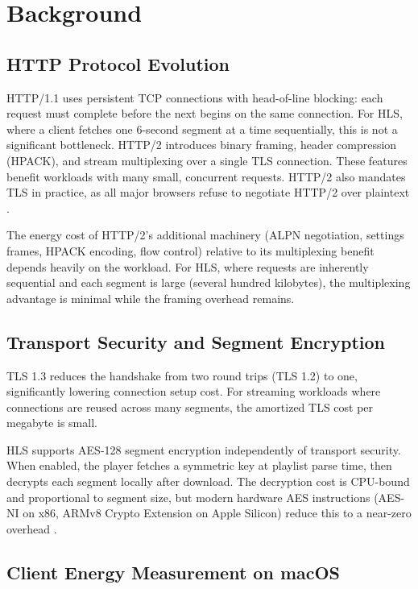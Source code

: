 \documentclass[conference]{IEEEtran}
\begin{document}
\section{Background}

\subsection{HTTP Protocol Evolution}

HTTP/1.1 \cite{b_http11} uses persistent TCP connections with head-of-line blocking:
each request must complete before the next begins on the same connection. For HLS,
where a client fetches one 6-second segment at a time sequentially, this is not a
significant bottleneck. HTTP/2 \cite{b_http2} introduces binary framing, header
compression (HPACK), and stream multiplexing over a single TLS connection. These
features benefit workloads with many small, concurrent requests. HTTP/2 also mandates
TLS in practice, as all major browsers refuse to negotiate HTTP/2 over plaintext
\cite{b_http2}.

The energy cost of HTTP/2's additional machinery (ALPN negotiation, settings frames,
HPACK encoding, flow control) relative to its multiplexing benefit depends heavily on
the workload. For HLS, where requests are inherently sequential and each segment is
large (several hundred kilobytes), the multiplexing advantage is minimal while the
framing overhead remains.

\subsection{Transport Security and Segment Encryption}

TLS 1.3 \cite{b_tls} reduces the handshake from two round trips (TLS 1.2) to one,
significantly lowering connection setup cost. For streaming workloads where connections
are reused across many segments, the amortized TLS cost per megabyte is small.

HLS supports AES-128 segment encryption independently of transport security. When
enabled, the player fetches a symmetric key at playlist parse time, then decrypts each
segment locally after download. The decryption cost is CPU-bound and proportional to
segment size, but modern hardware AES instructions (AES-NI on x86, ARMv8 Crypto
Extension on Apple Silicon) reduce this to a near-zero overhead \cite{b_aesni}.

\subsection{Client Energy Measurement on macOS}
\end{document}
